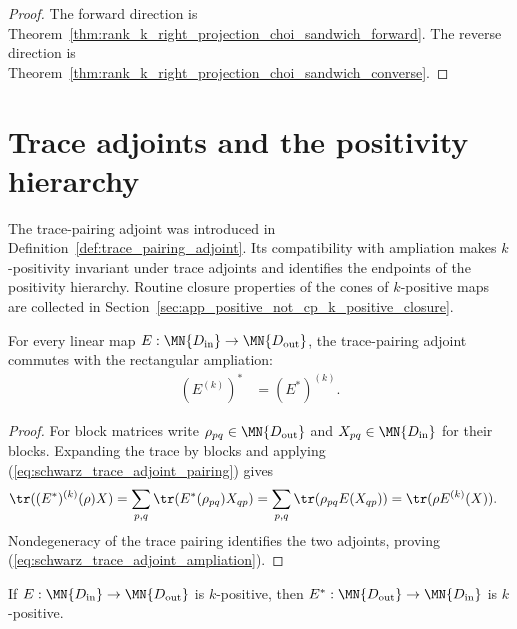 \begin{proof}
    \leanok
    The forward direction is
    Theorem~\ref{thm:rank_k_right_projection_choi_sandwich_forward}. The
    reverse direction is
    Theorem~\ref{thm:rank_k_right_projection_choi_sandwich_converse}.
\end{proof}

\section{Trace adjoints and the positivity hierarchy}

The trace-pairing adjoint was introduced in
Definition~\ref{def:trace_pairing_adjoint}. Its compatibility with
ampliation makes $k$-positivity invariant under trace adjoints and identifies
the endpoints of the positivity hierarchy. Routine closure properties of the
cones of $k$-positive maps are collected in
Section~\ref{sec:app_positive_not_cp_k_positive_closure}.

\begin{theorem}
    \label{thm:trace_pairing_adjoint_ampliation}
    \leanok
    For every linear map
    $E : \MN{D_{\rm in}}\to\MN{D_{\rm out}}$, the trace-pairing adjoint
    commutes with the rectangular ampliation:
    \begin{align}
        (E^{(k)})^*
         & =(E^*)^{(k)}.
        \label{eq:schwarz_trace_adjoint_ampliation}
    \end{align}
\end{theorem}

\begin{proof}
    \leanok
    For block matrices write $\rho_{pq}\in\MN{D_{\rm out}}$ and
    $X_{pq}\in\MN{D_{\rm in}}$ for their blocks. Expanding the trace by
    blocks and applying
    (\ref{eq:schwarz_trace_adjoint_pairing}) gives
    \begin{align}
        \tr((E^*)^{(k)}(\rho)X)
         & =\sum_{p,q}\tr(E^*(\rho_{pq})X_{qp})
        =\sum_{p,q}\tr(\rho_{pq}E(X_{qp}))
        =\tr(\rho E^{(k)}(X)).
        \notag
    \end{align}
    Nondegeneracy of the trace pairing identifies the two adjoints, proving
    (\ref{eq:schwarz_trace_adjoint_ampliation}).
\end{proof}

\begin{theorem}
    \label{thm:k_positive_trace_pairing_adjoint}
    \leanok
    If $E:\MN{D_{\rm in}}\to\MN{D_{\rm out}}$ is $k$-positive, then
    $E^*:\MN{D_{\rm out}}\to\MN{D_{\rm in}}$ is $k$-positive.
\end{theorem}

